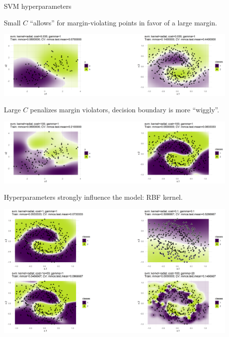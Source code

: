 \documentclass[11pt,compress,t,notes=noshow, xcolor=table]{beamer}
\begin{document}
\begin{vbframe}{SVM hyperparameters}

Small $C$ \enquote{allows} for margin-violating points in favor of a large margin. 


\begin{center}
\includegraphics[width=0.9\textwidth]{figure/svm_rbf_cost_1.png}
\end{center}


Large $C$ penalizes margin violators, decision boundary is more \enquote{wiggly}. 


\begin{center}
\includegraphics[width=0.9\textwidth]{figure/svm_rbf_cost_2.png}
\end{center}


\framebreak

Hyperparameters strongly influence the model: RBF kernel.

\begin{center}
\includegraphics[width=0.9\textwidth]{figure/svm_rbf_hyperparams.png}
\end{center}


\framebreak


\end{vbframe}
\end{document}
